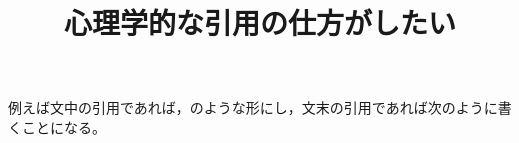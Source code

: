 \documentclass[uplatex,a4paper,11pt]{jsarticle}
\begin{document}
\title{心理学的な引用の仕方がしたい}

例えば文中の引用であれば，\citet{越智2013}のような形にし，文末の引用であれば次のように書くことになる\citep{Blechman1990}。




\nocite{*}
\end{document}
